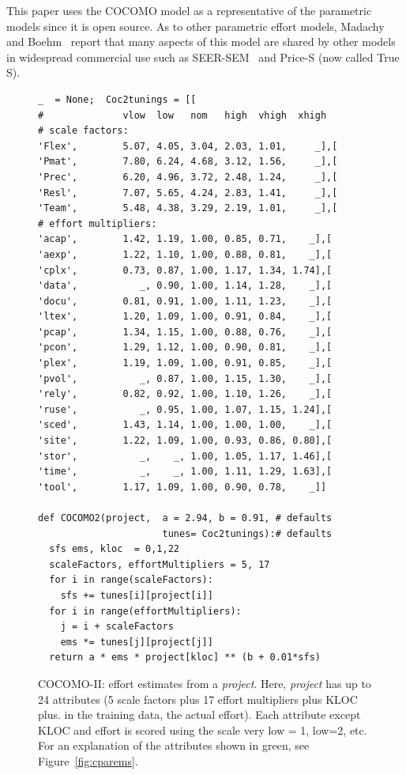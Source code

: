 \documentclass[final,twocolumn]{elsarticle}
\newcommand{\fig}[1]{Figure~\ref{fig:#1}}
\theoremstyle{break}
\begin{document}
 This paper uses the COCOMO model as a representative of the parametric models since it is open source.
 As to other parametric effort models,
 Madachy and Boehm~\cite{madachy2008comparative} report that many aspects of this model
 are shared by other models in widespread commercial
 use such as  SEER-SEM~\cite{boehm00b} and Price-S (now called True S).


 \begin{figure}[!t]
\begin{lstlisting}
_  = None;  Coc2tunings = [[
#              vlow  low   nom   high  vhigh  xhigh   
# scale factors:
'Flex',        5.07, 4.05, 3.04, 2.03, 1.01,     _],[
'Pmat',        7.80, 6.24, 4.68, 3.12, 1.56,     _],[
'Prec',        6.20, 4.96, 3.72, 2.48, 1.24,     _],[
'Resl',        7.07, 5.65, 4.24, 2.83, 1.41,     _],[
'Team',        5.48, 4.38, 3.29, 2.19, 1.01,     _],[
# effort multipliers:        
'acap',        1.42, 1.19, 1.00, 0.85, 0.71,    _],[
'aexp',        1.22, 1.10, 1.00, 0.88, 0.81,    _],[
'cplx',        0.73, 0.87, 1.00, 1.17, 1.34, 1.74],[
'data',           _, 0.90, 1.00, 1.14, 1.28,    _],[
'docu',        0.81, 0.91, 1.00, 1.11, 1.23,    _],[
'ltex',        1.20, 1.09, 1.00, 0.91, 0.84,    _],[
'pcap',        1.34, 1.15, 1.00, 0.88, 0.76,    _],[ 
'pcon',        1.29, 1.12, 1.00, 0.90, 0.81,    _],[
'plex',        1.19, 1.09, 1.00, 0.91, 0.85,    _],[ 
'pvol',           _, 0.87, 1.00, 1.15, 1.30,    _],[
'rely',        0.82, 0.92, 1.00, 1.10, 1.26,    _],[
'ruse',           _, 0.95, 1.00, 1.07, 1.15, 1.24],[
'sced',        1.43, 1.14, 1.00, 1.00, 1.00,    _],[ 
'site',        1.22, 1.09, 1.00, 0.93, 0.86, 0.80],[ 
'stor',           _,    _, 1.00, 1.05, 1.17, 1.46],[
'time',           _,    _, 1.00, 1.11, 1.29, 1.63],[
'tool',        1.17, 1.09, 1.00, 0.90, 0.78,    _]]

def COCOMO2(project,  a = 2.94, b = 0.91, # defaults
                      tunes= Coc2tunings):# defaults 
  sfs ems, kloc  = 0,1,22          
  scaleFactors, effortMultipliers = 5, 17
  for i in range(scaleFactors):
    sfs += tunes[i][project[i]]
  for i in range(effortMultipliers):
    j = i + scaleFactors
    ems *= tunes[j][project[j]] 
  return a * ems * project[kloc] ** (b + 0.01*sfs) 
\end{lstlisting}
\caption{COCOMO-II: effort estimates from a {\em project}.
Here, {\em project} has up to 24 attributes  (5 scale
factors plus 17 effort multipliers plus KLOC plus. in the training data, the actual effort).
Each attribute except KLOC and effort is scored
using the scale very low = 1, low=2, etc.
For an explanation of the attributes shown in
green, see \fig{cparems}.}\label{fig:coc2}
\end{figure}
\end{document}
